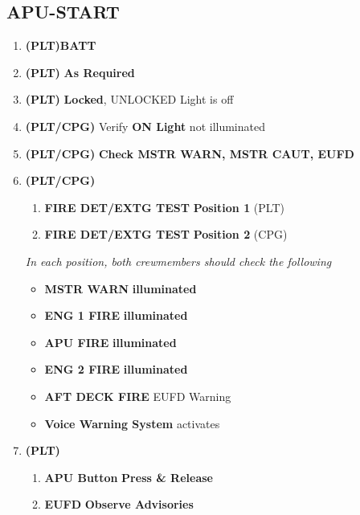 \documentclass[fontInter]{TechCheck}
\begin{document}
	\clearpage

	\subsection{APU-START}
	\begin{enumerate}[leftmargin=0.1\linewidth,rightmargin=0.1\linewidth, itemsep=4pt]
		\item {} \textbf{(PLT)}\cbstart \dotfill \textbf{BATT}\cbend
		\item {} \textbf{(PLT)} \dotfill \textbf{As Required}
		\item {} \textbf{(PLT)} \dotfill \textbf{Locked}, UNLOCKED Light is off
		\item {} \textbf{(PLT/CPG)} \dotfill Verify \textbf{ON Light} not illuminated
		\item {} \textbf{(PLT/CPG)} \dotfill \textbf{Check MSTR WARN, MSTR CAUT, EUFD}
		\item {} \textbf{(PLT/CPG)} 
		\begin{enumerate}[itemsep=4pt]
			\item \textbf{FIRE DET/EXTG TEST} \dotfill \textbf{Position 1} (PLT)
			\item \textbf{FIRE DET/EXTG TEST} \dotfill \textbf{Position 2} (CPG)
		\end{enumerate}
		\emph{In each position, both crewmembers should check the following}
		\begin{itemize}[itemsep=4pt]
			\item \textbf{MSTR WARN} \dotfill \textbf{illuminated}
			\item \textbf{ENG 1 FIRE} \dotfill \textbf{illuminated}
			\item \textbf{APU FIRE} \dotfill \textbf{illuminated}
			\item \textbf{ENG 2 FIRE} \dotfill \textbf{illuminated}
			\item \textbf{AFT DECK FIRE} \dotfill EUFD Warning
			\item \textbf{Voice Warning System} \dotfill activates
		\end{itemize}
		\item {} \textbf{(PLT)}\cbstart
		\begin{enumerate}[itemsep=4pt]
			\item \textbf{APU Button} \dotfill \textbf{Press \& Release}
			\item \textbf{EUFD} \dotfill \textbf{Observe Advisories}
			\begin{itemize}[itemsep=4pt]

\end{itemize}
\end{enumerate}
\end{enumerate}
\end{document}
